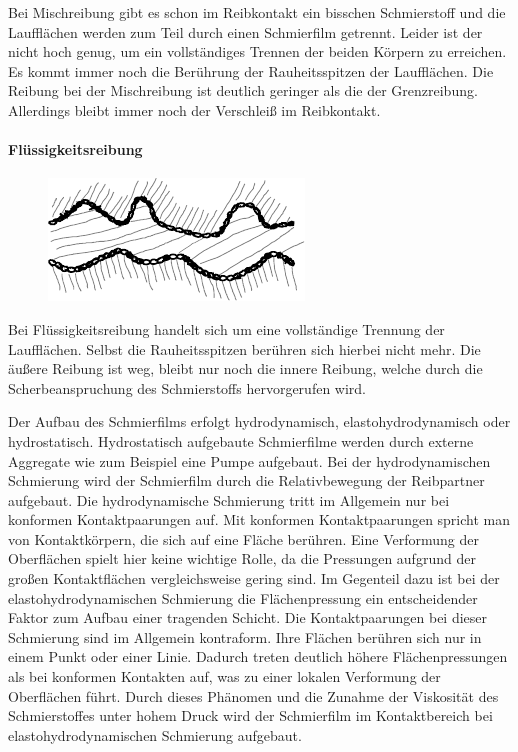 Bei Mischreibung gibt es schon im Reibkontakt ein bisschen Schmierstoff und die Laufflächen werden zum Teil durch einen Schmierfilm getrennt.
Leider ist der nicht hoch genug, um ein vollständiges Trennen der beiden Körpern zu erreichen.
Es kommt immer noch die Berührung der Rauheitsspitzen der Laufflächen.
Die Reibung bei der Mischreibung ist deutlich geringer als die der Grenzreibung. Allerdings bleibt immer noch der Verschleiß im Reibkontakt.

\paragraph{Flüssigkeitsreibung}
\label{par:fluessigkeitsreibung}
%
\begin{figure}
    \includegraphics[trim={0 0.5cm 0 0.5cm}]{./images/fluessigkeitreibung.pdf}
\end{figure}

Bei Flüssigkeitsreibung handelt sich um eine vollständige Trennung der Laufflächen.
Selbst die Rauheitsspitzen berühren sich hierbei nicht mehr.
Die äußere Reibung ist weg, bleibt nur noch die innere Reibung, welche durch die Scherbeanspruchung des Schmierstoffs hervorgerufen wird.

Der Aufbau des Schmierfilms erfolgt hydrodynamisch, elastohydrodynamisch oder hydrostatisch.
Hydrostatisch aufgebaute Schmierfilme werden durch externe Aggregate wie zum Beispiel eine Pumpe aufgebaut.
Bei der hydrodynamischen Schmierung wird der Schmierfilm durch die Relativbewegung der Reibpartner aufgebaut.
Die hydrodynamische Schmierung tritt im Allgemein nur bei konformen Kontaktpaarungen auf.
Mit konformen Kontaktpaarungen spricht man von Kontaktkörpern, die sich auf eine Fläche berühren.
Eine Verformung der Oberflächen spielt hier keine wichtige Rolle, da die Pressungen aufgrund der großen Kontaktflächen vergleichsweise gering sind.
Im Gegenteil dazu ist bei der elastohydrodynamischen Schmierung die Flächenpressung ein entscheidender Faktor zum Aufbau einer tragenden Schicht.
Die Kontaktpaarungen bei dieser Schmierung sind im Allgemein kontraform.
Ihre Flächen berühren sich nur in einem Punkt oder einer Linie.
Dadurch treten deutlich höhere Flächenpressungen als bei konformen Kontakten auf, was zu einer lokalen Verformung der Oberflächen führt.
Durch dieses Phänomen und die Zunahme der Viskosität des Schmierstoffes unter hohem Druck wird der Schmierfilm im Kontaktbereich bei elastohydrodynamischen Schmierung aufgebaut.

